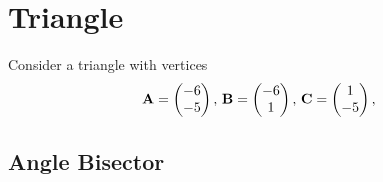 \documentclass[11pt]{book}
\begin{document}
\frontmatter
\tableofcontents
\setcounter{page}{0}
\mainmatter
\chapter{Triangle}
Consider a triangle with vertices
\begin{align}
\label{eq:tri-pts}
\vec{A}=\myvec{-6 \\ -5},\,
\vec{B}=\myvec{-6\\1},\,
	\vec{C}=\myvec{1\\-5},\,
\end{align}
\section{Angle Bisector}

\end{document}
